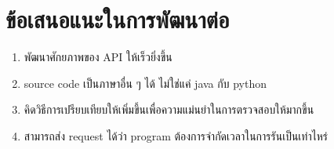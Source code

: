 \section{ข้อเสนอแนะในการพัฒนาต่อ}
    \begin{enumerate}
        \item พัฒนาศักยภาพของ API ให้เร็วยิ่งขึ้น
        \item source code เป็นภาษาอื่น ๆ ได้ ไม่ใช่แค่ java กับ python
        \item คิดวิธีการเปรียบเทียบให้เพิ่มขึ้นเพื่อความแม่นยำในการตรวจสอบให้มากขึ้น
        \item สามารถส่ง request ได้ว่า program ต้องการจำกัดเวลาในการรันเป็นเท่าไหร่
    \end{enumerate}